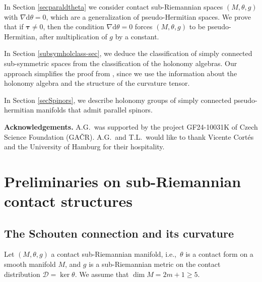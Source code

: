 \documentclass{amsart}
\theoremstyle{plain}
\theoremstyle{definition}
\newcommand{\bt}{{\boldsymbol{\tau}}}
\newcommand{\1}{\mathbf{1}}
\newcommand{\D}{{\mathcal D}}
\renewcommand{\d}{\mathrm{d}}
\newcommand{\+}{\oplus}
\newcommand{\acom}[1]{
 \marginpar{{\scriptsize A: #1 }}}
\begin{document}
In Section \ref{secparaldtheta}  we consider contact sub-Riemannian spaces $(M,\theta,g)$ with $\nabla\d\theta =0$, which are a generalization of pseudo-Hermitian  spaces. We prove that if $\bt\neq 0$, then the condition $\nabla\d\theta =0$ forces $(M,\theta,g)$ to be  pseudo-Hermitian, after multiplication of $g$ by a constant. 


In Section \ref{subsymholclass-sec}, we deduce the classification of simply connected sub-symmetric spaces from the classification of the holonomy algebras. Our approach simplifies the proof from \cite{BFG,FG,FGR}, since we use the information about the holonomy algebra and the structure of the curvature tensor.

In Section \ref{secSpinors}, we describe holonomy groups of simply connected pseudo-hermitian manifolds that admit parallel spinors.



\vskip0.3cm

{\bf Acknowledgements.}
A.G.~was supported by the project GF24-10031K of Czech Science Foundation (GA\v{C}R). A.G.~and T.L.~would like to thank Vicente Cort\'es and the University of Hamburg for their hospitality. 































\section{Preliminaries on  sub-Riemannian contact structures}\label{secHorCon}%

\subsection{The Schouten connection and its curvature}Let $(M,\theta,g)$ a contact sub-Riemannian manifold, 
 i.e.,~$\theta$ is a 
 contact form on a smooth manifold $M$, and $g$ is a sub-Riemannian metric on the contact distribution $\D=\ker\theta$.  We assume that $\dim M=2m+1\geq 5$. 
\end{document}
